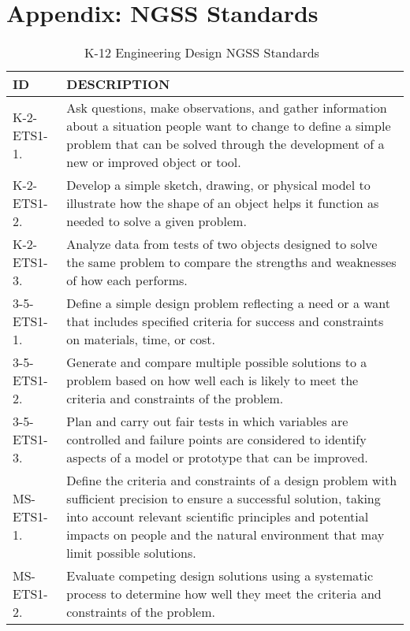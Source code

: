 
\chapter{Appendix: NGSS Standards} %

\label{AppendixNGSS} %


\begin{longtable}{p{1.8cm}p{11cm}}
\caption{K-12 Engineering Design NGSS Standards~\cite{ngss}} \\\hline
\textbf{ID} & \textbf{DESCRIPTION} \\ \hline
K-2-ETS1-1. & Ask questions, make observations, and gather information about a situation people want to change to define a simple problem that can be solved through the development of a new or improved object or tool.\\ \hline
K-2-ETS1-2. & Develop a simple sketch, drawing, or physical model to illustrate how the shape of an object helps it function as needed to solve a given problem.\\ \hline
K-2-ETS1-3. & Analyze data from tests of two objects designed to solve the same problem to compare the strengths and weaknesses of how each performs.\\ \hline
3-5-ETS1-1. & Define a simple design problem reflecting a need or a want that includes specified criteria for success and constraints on materials, time, or cost.\\ \hline
3-5-ETS1-2. & Generate and compare multiple possible solutions to a problem based on how well each is likely to meet the criteria and constraints of the problem.\\ \hline
3-5-ETS1-3. & Plan and carry out fair tests in which variables are controlled and failure points are considered to identify aspects of a model or prototype that can be improved.\\ \hline
MS-ETS1-1. & Define the criteria and constraints of a design problem with sufficient precision to ensure a successful solution, taking into account relevant scientific principles and potential impacts on people and the natural environment that may limit possible solutions.\\ \hline
MS-ETS1-2. & Evaluate competing design solutions using a systematic process to determine how well they meet the criteria and constraints of the problem.\\ \hline

\end{longtable}
